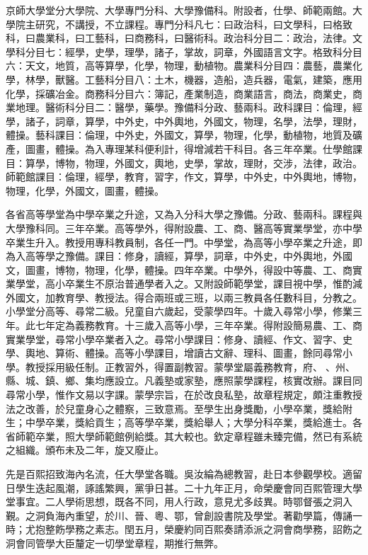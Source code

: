 \begin{pinyinscope}
京師大學堂分大學院、大學專門分科、大學豫備科。附設者，仕學、師範兩館。大學院主研究，不講授，不立課程。專門分科凡七：曰政治科，曰文學科，曰格致科，曰農業科，曰工藝科，曰商務科，曰醫術科。政治科分目二：政治，法律。文學科分目七：經學，史學，理學，諸子，掌故，詞章，外國語言文字。格致科分目六：天文，地質，高等算學，化學，物理，動植物。農業科分目四：農藝，農業化學，林學，獸醫。工藝科分目八：土木，機器，造船，造兵器，電氣，建築，應用化學，採礦冶金。商務科分目六：簿記，產業制造，商業語言，商法，商業史，商業地理。醫術科分目二：醫學，藥學。豫備科分政、藝兩科。政科課目：倫理，經學，諸子，詞章，算學，中外史，中外輿地，外國文，物理，名學，法學，理財，體操。藝科課目：倫理，中外史，外國文，算學，物理，化學，動植物，地質及礦產，圖畫，體操。為入專理某科便利計，得增減若干科目。各三年卒業。仕學館課目：算學，博物，物理，外國文，輿地，史學，掌故，理財，交涉，法律，政治。師範館課目：倫理，經學，教育，習字，作文，算學，中外史，中外輿地，博物，物理，化學，外國文，圖畫，體操。

各省高等學堂為中學卒業之升途，又為入分科大學之豫備。分政、藝兩科。課程與大學豫科同。三年卒業。高等學外，得附設農、工、商、醫高等實業學堂，亦中學卒業生升入。教授用專科教員制，各任一門。中學堂，為高等小學卒業之升途，即為入高等學之豫備。課目：修身，讀經，算學，詞章，中外史，中外輿地，外國文，圖畫，博物，物理，化學，體操。四年卒業。中學外，得設中等農、工、商實業學堂，高小卒業生不原治普通學者入之。又附設師範學堂，課目視中學，惟酌減外國文，加教育學、教授法。得合兩班或三班，以兩三教員各任數科目，分教之。小學堂分高等、尋常二級。兒童自六歲起，受蒙學四年。十歲入尋常小學，修業三年。此七年定為義務教育。十三歲入高等小學，三年卒業。得附設簡易農、工、商實業學堂，尋常小學卒業者入之。尋常小學課目：修身、讀經、作文、習字、史學、輿地、算術、體操。高等小學課目，增讀古文辭、理科、圖畫，餘同尋常小學。教授採用級任制。正教習外，得置副教習。蒙學堂屬義務教育，府、、州、縣、城、鎮、鄉、集均應設立。凡義塾或家塾，應照蒙學課程，核實改辦。課目同尋常小學，惟作文易以字課。蒙學宗旨，在於改良私塾，故章程規定，頗注重教授法之改善，於兒童身心之體察，三致意焉。至學生出身獎勵，小學卒業，獎給附生；中學卒業，獎給貢生；高等學卒業，獎給舉人；大學分科卒業，獎給進士。各省師範卒業，照大學師範館例給獎。其大較也。欽定章程雖未臻完備，然已有系統之組織。頒布未及二年，旋又廢止。

先是百熙招致海內名流，任大學堂各職。吳汝綸為總教習，赴日本參觀學校。適留日學生迭起風潮，諑謠繁興，黨爭日甚。二十九年正月，命榮慶會同百熙管理大學堂事宜。二人學術思想，既各不同，用人行政，意見尤多歧異。時鄂督張之洞入覲。之洞負海內重望，於川、晉、粵、鄂，曾創設書院及學堂。著勸學篇，傳誦一時；尤抱整飭學務之素志。閏五月，榮慶約同百熙奏請添派之洞會商學務，詔飭之洞會同管學大臣釐定一切學堂章程，期推行無弊。


\end{pinyinscope}
